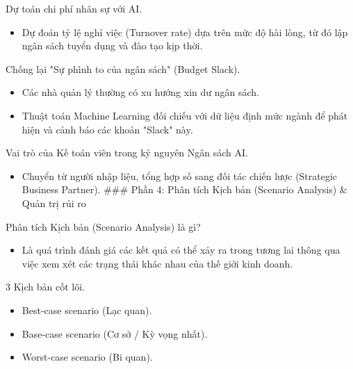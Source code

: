 \documentclass[aspectratio=169]{beamer}
\begin{document}
\begin{frame}{Dự toán chi phí nhân sự với AI.}
    \begin{itemize}
        \item Dự đoán tỷ lệ nghỉ việc (Turnover rate) dựa trên mức độ hài lòng, từ đó lập ngân sách tuyển dụng và đào tạo kịp thời.
    \end{itemize}
\end{frame}


\begin{frame}{Chống lại "Sự phình to của ngân sách" (Budget Slack).}
    \begin{itemize}
        \item Các nhà quản lý thường có xu hướng xin dư ngân sách.
        \item Thuật toán Machine Learning đối chiếu với dữ liệu định mức ngành để phát hiện và cảnh báo các khoản "Slack" này.
    \end{itemize}
\end{frame}


\begin{frame}{Vai trò của Kế toán viên trong kỷ nguyên Ngân sách AI.}
    \begin{itemize}
        \item Chuyển từ người nhập liệu, tổng hợp số sang đối tác chiến lược (Strategic Business Partner).
        ### Phần 4: Phân tích Kịch bản (Scenario Analysis) \& Quản trị rủi ro
    \end{itemize}
\end{frame}


\begin{frame}{Phân tích Kịch bản (Scenario Analysis) là gì?}
    \begin{itemize}
        \item Là quá trình đánh giá các kết quả có thể xảy ra trong tương lai thông qua việc xem xét các trạng thái khác nhau của thế giới kinh doanh.
    \end{itemize}
\end{frame}


\begin{frame}{3 Kịch bản cốt lõi.}
    \begin{itemize}
        \item Best-case scenario (Lạc quan).
        \item Base-case scenario (Cơ sở / Kỳ vọng nhất).
        \item Worst-case scenario (Bi quan).
    \end{itemize}
\end{frame}
\end{document}
